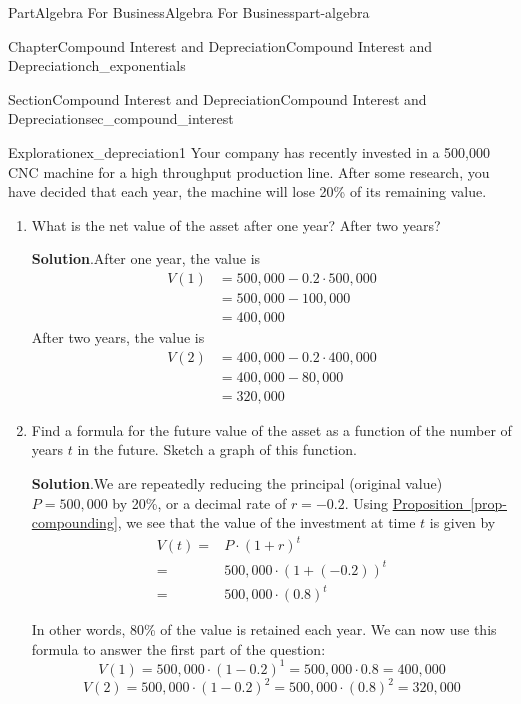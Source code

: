 \documentclass{tufte-book}
\newcommand{\blocktitlefont}{\relax}
\newcommand{\xreffont}{\relax}
\numberwithin{equation}{chapter}
\newcommand{\amp}{&}
\begin{document}
\begin{partptx}{Part}{Algebra For Business}{}{Algebra For Business}{}{}{part-algebra}
\begin{chapterptx}{Chapter}{Compound Interest and Depreciation}{}{Compound Interest and Depreciation}{}{}{ch_exponentials}
\begin{sectionptx}{Section}{Compound Interest and Depreciation}{}{Compound Interest and Depreciation}{}{}{sec_compound_interest}
\begin{exploration}{Exploration}{}{ex_depreciation1}
Your company has recently invested in a \textdollar{}500,000 CNC machine for a high throughput production line. After some research, you have decided that each year, the machine will lose 20\% of its remaining value.%
\begin{enumerate}[font=\bfseries,label=(\alph*),ref=\alph*]%
\item{}What is the net value of the asset after one year?  After two years?%
\par\smallskip%
\noindent\textbf{\blocktitlefont Solution}.\hypertarget{ex_depreciation1-2-2}{}\quad{}After one year, the value is%
\begin{align*}
V(1) \amp = 500,000 - 0.2\cdot 500,000\\
\amp = 500,000 - 100,000\\
\amp = 400,000 
\end{align*}
After two years, the value is%
\begin{align*}
V(2) \amp = 400,000 - 0.2\cdot 400,000\\
\amp = 400,000 - 80,000\\
\amp = 320,000 
\end{align*}
%
\item{}Find a formula for the future value of the asset as a function of the number of years \(t\) in the future. Sketch a graph of this function.%
\par\smallskip%
\noindent\textbf{\blocktitlefont Solution}.\hypertarget{ex_depreciation1-3-2}{}\quad{}We are repeatedly reducing the principal (original value) \(P=500,000\) by 20\%, or a decimal rate of \(r= -0.2\). Using \hyperref[prop-compounding]{Proposition~{\xreffont\ref{prop-compounding}}}, we see that the value of the investment at time \(t\) is given by%
\begin{align*}
V(t) = \amp  P\cdot (1 + r)^t \\
= \amp 500,000\cdot (1 + (-0.2))^t \\
= \amp 500,000\cdot (0.8)^t 
\end{align*}
%
\par
In other words, 80\% of the value is retained each year.  We can now use this formula to answer the first part of the question:%
\begin{equation*}
V(1) = 500,000 \cdot ( 1 - 0.2 )^1 = 500,000 \cdot 0.8 = 400,000
\end{equation*}
%
\begin{equation*}
V(2) = 500,000 \cdot ( 1 - 0.2 )^2 = 500,000 \cdot (0.8)^2 = 320,000
\end{equation*}

\end{enumerate}
\end{exploration}
\end{sectionptx}
\end{chapterptx}
\end{partptx}
\end{document}
